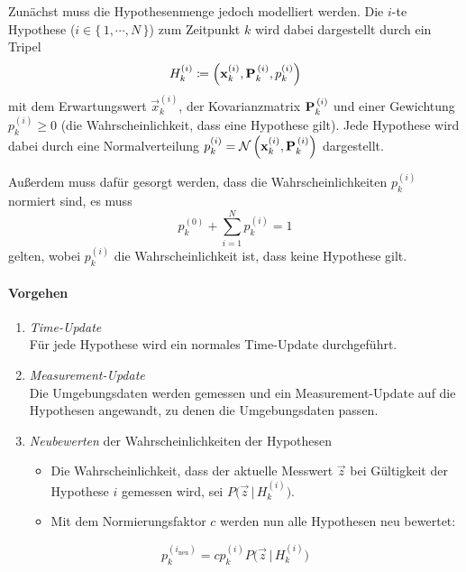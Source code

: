 				Zunächst muss die Hypothesenmenge jedoch modelliert werden. Die \(i\)-te Hypothese (\( i \in \{\, 1, \cdots, N \,\} \)) zum Zeitpunkt \(k\) wird dabei dargestellt durch ein Tripel
				\begin{equation*}
					H_k^{(i)} \coloneqq \Big( \boldsymbol{\mathrm{x}}_k^{(i)}, \boldsymbol{\mathrm{P}}_k^{\,(i)}, p_k^{(i)} \Big)
				\end{equation*}
				mit dem Erwartungswert \( \vec{x}_k^{(i)} \), der Kovarianzmatrix \( \boldsymbol{\mathrm{P}}_k^{\,(i)} \) und einer Gewichtung \( p_k^{(i)} \geq 0 \) (die Wahrscheinlichkeit, dass eine Hypothese gilt). Jede Hypothese wird dabei durch eine Normalverteilung \( p_k^{(i)} = \mathcal{N}\,\Big( \boldsymbol{\mathrm{x}}_k^{(i)}, \boldsymbol{\mathrm{P}}_k^{\,(i)} \Big) \) dargestellt.
				
				Außerdem muss dafür gesorgt werden, dass die Wahrscheinlichkeiten \( p_k^{(i)} \) normiert sind, \dh es muss
				\begin{equation*}
					p_k^{(0)} + \sum_{i = 1}^{N} p_k^{(i)} = 1
				\end{equation*}
				gelten, wobei \( p_k^{(i)} \) die Wahrscheinlichkeit ist, dass keine Hypothese gilt.
				
				\paragraph{Vorgehen}
					\begin{enumerate}
						\item \emph{Time-Update} \\ Für jede Hypothese wird ein normales Time-Update durchgeführt.
						\item \emph{Measurement-Update} \\ Die Umgebungsdaten werden gemessen und ein Measurement-Update auf die Hypothesen angewandt, zu denen die Umgebungsdaten passen.
						\item \emph{Neubewerten} der Wahrscheinlichkeiten der Hypothesen
							\begin{itemize}
								\item Die Wahrscheinlichkeit, dass der aktuelle Messwert \( \vec{z} \) bei Gültigkeit der Hypothese \( i \) gemessen wird, sei \( P\Big(\vec{z} \,\big\vert\, H_k^{(i)}\Big) \).
								\item Mit dem Normierungsfaktor \(c\) werden nun alle Hypothesen neu bewertet:
							\end{itemize}
					\end{enumerate}
					\begin{equation*}
						p_k^{(i_\text{neu})} = c p_k^{(i)} P\Big(\vec{z} \,\big\vert\, H_k^{(i)}\Big)
					\end{equation*}
					
